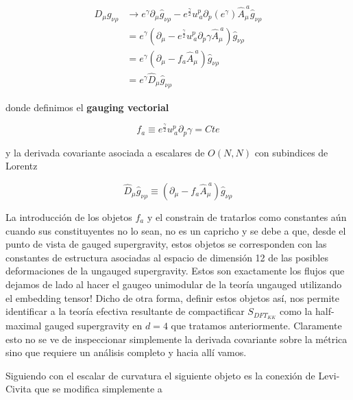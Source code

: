 \documentclass{article}
\numberwithin{equation}{section}
\begin{document}
\begin{equation}\label{auxDg}
\begin{aligned}
D_{\mu}g_{\nu \rho} &\longrightarrow e^{\gamma} \partial_{\mu}\hat{g}_{\nu \rho} - e^{\frac{\gamma}{2}} u^{p}_{\ a} \partial_p (e^{\gamma}) \hat{A}_{\mu}^{\ a} \hat{g}_{\nu \rho}\\
&= e^{\gamma} \left( \partial_{\mu} - e^{\frac{\gamma}{2}} u^{p}_{\ a} \partial_p \gamma \hat{A}_{\mu}^{\ a} \right) \hat{g}_{\nu \rho}\\
&= e^{\gamma} \left( \partial_{\mu} - f_a \hat{A}_{\mu}^{\ a} \right) \hat{g}_{\nu \rho}\\
&= e^{\gamma} \hat{D}_{\mu}\hat{g}_{\nu \rho}
\end{aligned}
\end{equation}

donde definimos el \textbf{gauging vectorial}

\begin{equation}\label{fa}
f_a \equiv e^{\frac{\gamma}{2}} u^{p}_{\ a} \partial_p \gamma= Cte
\end{equation}

y la derivada covariante asociada a escalares de $ O(N,N) $ con subindices de Lorentz 

\begin{equation}\label{Dhatg}
\hat{D}_{\mu}\hat{g}_{\nu \rho} \equiv \left( \partial_{\mu} - f_a \hat{A}_{\mu}^{\ a} \right) \hat{g}_{\nu \rho}
\end{equation}

La introducción de los objetos $ f_a $ y el constrain de tratarlos como constantes aún cuando sus constituyentes no lo sean, no es un capricho y se debe a que, desde el punto de vista de gauged supergravity, estos objetos se corresponden con las constantes de estructura asociadas al espacio de dimensión 12 de las posibles deformaciones de la ungauged supergravity. Estos son exactamente los flujos que dejamos de lado al hacer el gaugeo unimodular de la teoría ungauged utilizando el embedding tensor!
Dicho de otra forma, definir estos objetos así, nos permite identificar a la teoría efectiva resultante de compactificar $ S_{DFT_{KK}} $ como la half-maximal gauged supergravity en $ d=4 $ que tratamos anteriormente. Claramente esto no se ve de inspeccionar simplemente la derivada covariante sobre la métrica sino que requiere un análisis completo y hacia allí vamos.

Siguiendo con el escalar de curvatura el siguiente objeto es la conexión de Levi-Civita que se modifica simplemente a 
\end{document}
